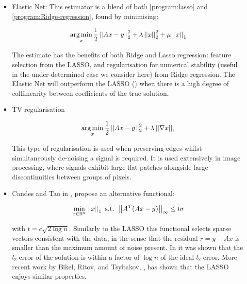 \begin{itemize}
\item Elastic Net: This estimator is a blend of both \eqref{program:lasso} and \eqref{program:Ridge-regression}, found by minimising:

\begin{equation}
\operatorname*{arg\,min}_x \frac{1}{2}\left|\left|Ax-y\right|\right|_2^2 + \lambda\left|\left|x\right|\right|_2^2 + \mu\left|\left|x\right|\right|_1
\label{program:enat}
\end{equation}

The estimate has the benefits of both Ridge and Lasso regression: feature selection from the LASSO, and regularisation for numerical stability (useful in the under-determined case we consider here) from Ridge regression. The Elastic Net will outperform the LASSO (\cite{zou2005regularization}) when there is a high degree of collfinearity between coefficients of the true solution.

\item TV regularisation

\begin{equation}
\operatorname*{arg\,min}_x \frac{1}{2}\left|\left|Ax-y\right|\right|_2^2 +  \lambda\left|\left|\nabla x\right|\right|_1
\label{program:enat}
\end{equation}

This type of regularisation is used when preserving edges whilst simultaneously de-noising a signal is required. It is used extensively in image processing, where signals exhibit large flat patches alongside large discontinuities between groups of pixels.

\item Candes and Tao in \cite{candes2007dantzig}, propose an alternative  functional:

\begin{equation}
\min_{x \in {\mathbb{R}}^n} \left|\left|x\right|\right|_1 \text{ s.t. } \left|\left|A^T(Ax-y)\right|\right|_{\infty} \leq t\sigma
\end{equation}

with \(t = c\sqrt{2\log{n}}\). Similarly to the LASSO this functional selects sparse vectors consistent with the data, in the sense that the residual \(r = y - Ax\) is smaller than the maximum amount of noise present. In \cite{candes2007dantzig} it was shown that the \(l_2\) error of the solution is within a factor of \(\log{n}\) of the ideal \(l_2\) error. More recent work by Bikel, Ritov, and Tsybakov, \cite{bickel2009simultaneous}, has shown that the LASSO enjoys similar properties.
\end{itemize}

